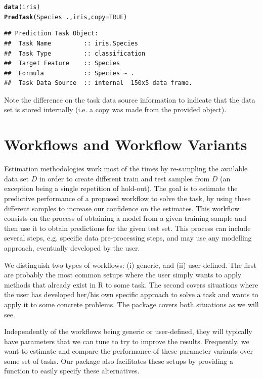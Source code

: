 \documentclass[10pt,a4paper]{article}\usepackage[]{graphicx}\usepackage[]{color}
\makeatletter
\newcommand{\hlnum}[1]{\textcolor[rgb]{0.686,0.059,0.569}{#1}}%
\newcommand{\hlopt}[1]{\textcolor[rgb]{0,0,0}{#1}}%
\newcommand{\hlstd}[1]{\textcolor[rgb]{0.345,0.345,0.345}{#1}}%
\newcommand{\hlkwc}[1]{\textcolor[rgb]{0.333,0.667,0.333}{#1}}%
\newcommand{\hlkwd}[1]{\textcolor[rgb]{0.737,0.353,0.396}{\textbf{#1}}}%
\newenvironment{kframe}{%
 \def\at@end@of@kframe{}%
 \ifinner\ifhmode%
  \def\at@end@of@kframe{\end{minipage}}%
  \begin{minipage}{\columnwidth}%
 \fi\fi%
 \def\FrameCommand##1{\hskip\@totalleftmargin \hskip-\fboxsep
 \colorbox{shadecolor}{##1}\hskip-\fboxsep
     \hskip-\linewidth \hskip-\@totalleftmargin \hskip\columnwidth}%
 \MakeFramed {\advance\hsize-\width
   \@totalleftmargin\z@ \linewidth\hsize
   \@setminipage}}%
 {\par\unskip\endMakeFramed%
 \at@end@of@kframe}
\newenvironment{knitrout}{}{} %
\makeatother
\begin{document}
\begin{knitrout}\footnotesize
{}\color{fgcolor}\begin{kframe}
\begin{alltt}
\hlkwd{data}\hlstd{(iris)}
\hlkwd{PredTask}\hlstd{(Species} \hlopt{~} \hlstd{.,iris,}\hlkwc{copy}\hlstd{=}\hlnum{TRUE}\hlstd{)}
\end{alltt}
\begin{verbatim}
## Prediction Task Object:
## 	Task Name         :: iris.Species 
## 	Task Type         :: classification 
## 	Target Feature    :: Species 
## 	Formula           :: Species ~ .
## 	Task Data Source  :: internal  150x5 data frame.
\end{verbatim}
\end{kframe}
\end{knitrout}

Note the difference on the task data source information to indicate that the data set is stored internally (i.e. a copy was made from the provided object). 

\section{Workflows and Workflow Variants}

Estimation methodologies work most of the times by re-sampling the
available data set $D$ in order to create different train and test
samples from $D$ (an exception being a single repetition of hold-out). The goal is to estimate the predictive performance
of a proposed workflow to solve the task, by using these different
samples to increase our confidence on the estimates. This workflow
consists on the process of obtaining a model from a given training
sample and then use it to obtain predictions for the given test
set. This process can include several steps, e.g. specific data
pre-processing steps, and may use any modelling approach, eventually
developed  by the user. 

We distinguish two types of workflows: (i) generic, and (ii) user-defined. The first are probably the most common setups where the user simply wants to apply methods that already exist in R to some task. The second covers situations where the user has developed her/his own specific approach to solve a task and wants to apply it to some concrete problems. The package covers both situations as we will see.

Independently of the workflows being generic or user-defined, they will typically have parameters that we can tune to try to improve the results. Frequently, we want to estimate and compare the performance of these parameter variants over some set of tasks. Our package also facilitates these setups by providing a function to easily specify these alternatives.
\end{document}
